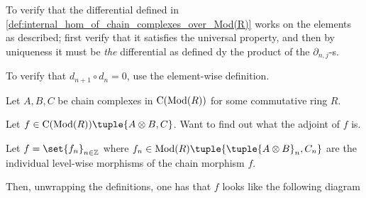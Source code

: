 \begin{remark}
    To verify that the differential defined in \autoref{def:internal_hom_of_chain_complexes_over_Mod(R)} works on the elements as described; first verify that it satisfies the universal property, and then by uniqueness it must be \emph{the} differential as defined dy the product of the \( \partial_{n, j} \)-s.

    To verify that \( d_{n + 1} \circ d_n = 0 \), use the element-wise definition.
\end{remark}

\begin{remark}
    Let \( A, B, C \) be chain complexes in \( \operatorname{C}(\operatorname{Mod}(R)) \) for some commutative ring \( R \).

    Let \( f \in \C(\Mod(R))\tuple{A \otimes B, C} \). Want to find out what the adjoint of \( f \) is.

    Let \( f = \set{f_n}_{n \in \Zb} \) where \( f_n \in \Mod(R)\tuple{ \tuple{A \otimes B}_n, C_n} \) are the individual level-wise morphisms of the chain morphism \( f \).

    Then, unwrapping the definitions, one has that \( f \) looks like the following diagram
    \begin{center}
\end{center}
\end{remark}
